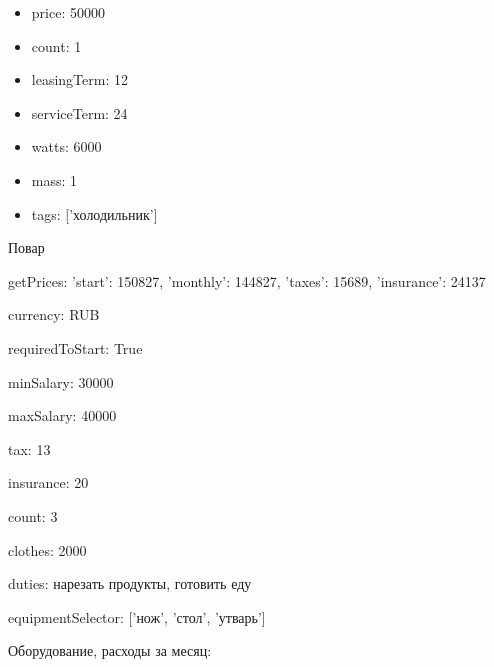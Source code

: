 \documentclass[a4paper,12pt]{article}
\begin{document}
\begin{enumerate}
\begin{itemize}
          \item price: 50000
        
          \item count: 1
        
          \item leasingTerm: 12
        
          \item serviceTerm: 24
        
          \item watts: 6000
        
          \item mass: 1
        
          \item tags: ['холодильник']
        
        \end{itemize}
      
    \end{enumerate}
    
    
      
      Повар
        
        getPrices: {'start': 150827, 'monthly': 144827, 'taxes': 15689, 'insurance': 24137}

        
        currency: RUB

        
        requiredToStart: True

        
        minSalary: 30000

        
        maxSalary: 40000

        
        tax: 13

        
        insurance: 20

        
        count: 3

        
        clothes: 2000

        
        duties: нарезать продукты, готовить еду

        
        equipmentSelector: ['нож', 'стол', 'утварь']

        
      
    

    Оборудование, расходы за месяц:

  
\end{document}
